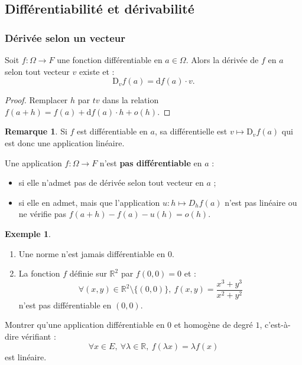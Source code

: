 \documentclass[french]{article}
\newcommand{\R}{\mathbb{R}}
\renewcommand{\d}{\text{d}}
\newcommand{\D}{\text{D}}
\theoremstyle{plain}
\theoremstyle{definition}
\newtheorem*{ex}{Exemple}
\newtheorem*{rmq}{Remarque}
\theoremstyle{remark}
\begin{document}
\subsection{Différentiabilité et dérivabilité}

\subsubsection*{Dérivée selon un vecteur}

\begin{prop}%
	Soit $f:\Omega\to F$ une fonction différentiable en $a\in\Omega$. Alors la dérivée de $f$ en $a$ selon tout vecteur $v$ existe et :
	$$\D_vf(a)=\d f(a)\cdot v.$$
\end{prop}
\begin{proof}
	Remplacer $h$ par $tv$ dans la relation $f(a+h)=f(a)+\d f(a)\cdot h+o(h)$.
\end{proof}

\begin{rmq}
	Si $f$ est différentiable en $a$, sa différentielle est $v\mapsto \D_vf(a)$ qui est donc une application linéaire.
\end{rmq}

\begin{met}
	Une application $f:\Omega\to F$ n'est \textbf{pas différentiable} en $a$ :
	\begin{itemize}
		\item si elle n'admet pas de dérivée selon tout vecteur en $a$ ;
		\item si elle en admet, mais que l'application $u:h\mapsto D_hf(a)$ n'est pas linéaire ou ne vérifie pas $f(a+h)-f(a)-u(h)=o(h)$.
	\end{itemize}
\end{met}

\begin{ex}
	\begin{enumerate}
		\item Une norme n'est jamais différentiable en $0$. %
		\item La fonction $f$ définie sur $\R^2$ par $f(0,0)=0$ et :
		$$\forall (x,y)\in\R^2\setminus\{(0,0)\},\ f(x,y)=\frac{x^3+y^3}{x^2+y^2}$$ n'est pas différentiable en $(0,0)$.
	\end{enumerate}
\end{ex}

\begin{exo}
	Montrer qu'une application différentiable en $0$ et homogène de degré $1$, c'est-à-dire vérifiant : 
	$$\forall x\in E,\ \forall\lambda\in\R,\ f(\lambda x)=\lambda f(x)$$ est linéaire.
\end{exo}
\end{document}
